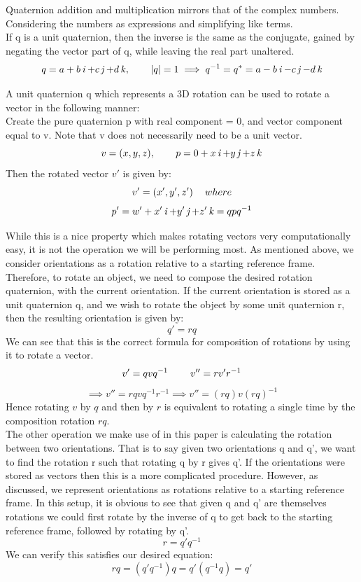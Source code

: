 Quaternion addition and multiplication mirrors that of the complex numbers. Considering the numbers as expressions and simplifying like terms.\\
If q is a unit quaternion, then the inverse is the same as the conjugate, gained by negating the vector part of q, while leaving the real part unaltered.
$$ q = a + b\operatorname{\mathit{i}} + c\operatorname{\mathit{j}} + d\operatorname{\mathit{k}}, \operatorname{\operatorname{\: \: \: \:} \operatorname{\: \: \: \:}} |q| = 1 \implies q^{-1} = q^* = a - b\operatorname{\mathit{i}} - c\operatorname{\mathit{j}} - d\operatorname{\mathit{k}}$$

A unit quaternion q which represents a 3D rotation can be used to rotate a vector in the following manner:\\
Create the pure quaternion p with real component = 0, and vector component equal to v. Note that v does not necessarily need to be a unit vector.
$$v = (x,y,z), \operatorname{\operatorname{\: \: \: \:} \operatorname{\: \: \: \:}} p = 0 + x\operatorname{\mathit{i}} + y\operatorname{\mathit{j}} + z\operatorname{\mathit{k}} $$
Then the rotated vector $v'$ is given by:
$$v' = (x', y', z') \operatorname{\: \: \: \:} where$$
$$p' = w' + x'\operatorname{\mathit{i}} + y'\operatorname{\mathit{j}} + z'\operatorname{\mathit{k}} = qpq^{-1}$$

While this is a nice property which makes rotating vectors very computationally easy, it is not the operation we will be performing most. As mentioned above, we consider orientations as a rotation relative to a starting reference frame. Therefore, to rotate an object, we need to compose the desired rotation quaternion, with the current orientation. If the current orientation is stored as a unit quaternion q, and we wish to rotate the object by some unit quaternion r, then the resulting orientation is given by:
$$q' = rq$$
We can see that this is the correct formula for composition of rotations by using it to rotate a vector.
$$v' = qvq^{-1} \operatorname{\operatorname{\: \: \: \:} \operatorname{\: \: \: \:}} v'' = rv'r^{-1}$$
$$\implies v'' = rqvq^{-1}r^{-1} \implies v'' = (rq)v(rq)^{-1}$$
Hence rotating $v$ by $q$ and then by $r$ is equivalent to rotating a single time by the composition rotation $rq$.\\

The other operation we make use of in this paper is calculating the rotation between two orientations. That is to say given two orientations q and q', we want to find the rotation r such that rotating q by r gives q'. If the orientations were stored as vectors then this is a more complicated procedure. However, as discussed, we represent orientations as rotations relative to a starting reference frame. In this setup, it is obvious to see that given q and q' are themselves rotations we could first rotate by the inverse of q to get back to the starting reference frame, followed by rotating by q'.
$$r = q'q^{-1}$$
We can verify this satisfies our desired equation:
$$rq = (q'q^{-1})q = q'(q^{-1}q) = q'$$


